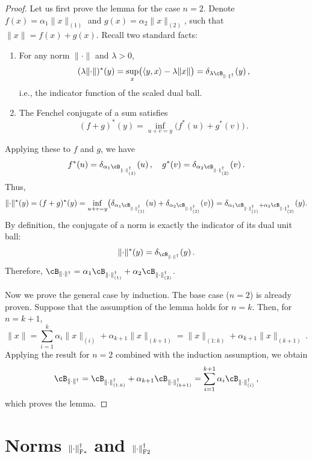 \documentclass[pmlr]{jmlr}%
\newcommand{\norm}[1]{\lVert #1\rVert}
\DeclarePairedDelimiter{\normfstar}{\|}{\|_\mathrm{F*}}
\DeclarePairedDelimiter{\normftwo}{\|}{\|_\mathrm{F2}}
\begin{document}
 \begin{proof}
   Let us first prove the lemma for the case $n = 2$. Denote $f(x) = \alpha_1 \norm{x}_{(1)}$ and $g(x) = \alpha_2 \norm{x}_{(2)}$, such that $\norm{x} = f(x) + g(x)$. Recall two standard facts:
   \begin{enumerate}
     \item For any norm $\norm{\cdot}$ and $\lambda>0$,
           \[
             (\lambda \norm{\cdot})^*(y) =
             \sup_{x}\bigl( \langle y,x \rangle - \lambda \norm{x}\bigr)
             = \delta_{\lambda \cB_{\norm{\cdot}^\dagger}}(y)\,,
           \]
           i.e., the indicator function of the scaled dual ball.
     \item The Fenchel conjugate of a sum satisfies
           \[
             (f+g)^*(y) = \inf_{u+v=y} \bigl(f^*(u) + g^*(v)\bigr)\,.
           \]
   \end{enumerate}
   Applying these to $f$ and $g$, we have
   \[
     f^*(u) = \delta_{\alpha_1 \cB_{\norm{\cdot}_{(1)}^\dagger}}(u)\,,
     \quad
     g^*(v) = \delta_{\alpha_2 \cB_{\norm{\cdot}_{(2)}^\dagger}}(v)\,.
   \]
   Thus,
   \[
     \norm{\cdot}^*(y)
     = (f+g)^*(y)
     = \inf_{u+v=y}
     \bigl(
     \delta_{\alpha_1 \cB_{\norm{\cdot}_{(1)}^\dagger}}(u)
     +
     \delta_{\alpha_2 \cB_{\norm{\cdot}_{(2)}^\dagger}}(v)
     \bigr)
     =
     \delta_{\alpha_1 \cB_{\norm{\cdot}_{(1)}^\dagger}+\alpha_2 \cB_{\norm{\cdot}_{(2)}^\dagger}}(y).
   \]
   By definition, the conjugate of a norm is exactly the indicator of its dual unit ball:
   \[
   \norm{\cdot}^*(y) = \delta_{\cB_{\norm{\cdot}^\dagger}}(y)\,.
   \]
   Therefore, $\cB_{\norm{\cdot}^\dagger} = \alpha_1 \cB_{\norm{\cdot}_{(1)}^\dagger} + \alpha_2 \cB_{\norm{\cdot}_{(2)}^\dagger}$.
 
   Now we prove the general case by induction. The base case ($n=2$) is already proven. Suppose that the assumption of the lemma holds for $n = k$. Then, for $n = k + 1$,
   \[
   \norm{x} = \sum_{i = 1}^k \alpha_i \norm{x}_{(i)} + \alpha_{k + 1}\norm{x}_{(k + 1)} = \norm{x}_{(1:k)} + \alpha_{k + 1}\norm{x}_{(k + 1)}\,.
   \]
   Applying the result for $n=2$ combined with the induction assumption, we obtain
   \[
   \cB_{\norm{\cdot}^\dagger} = \cB_{\norm{\cdot}_{(1:k)}^\dagger} + \alpha_{k + 1} \cB_{\norm{\cdot}_{(k + 1)}^\dagger} = \sum_{i = 1}^{k + 1} \alpha_i \cB_{\norm{\cdot}_{(i)}^\dagger}\,,
   \]
   which proves the lemma.
 \end{proof}
 
 \section[Norms for F-Muon and F-Neon]%
         {Norms $\normfstar{\cdot}^\dagger$ and $\normftwo{\cdot}^\dagger$}
 \label{sec:f2_fstar_norms}
 
\end{document}
